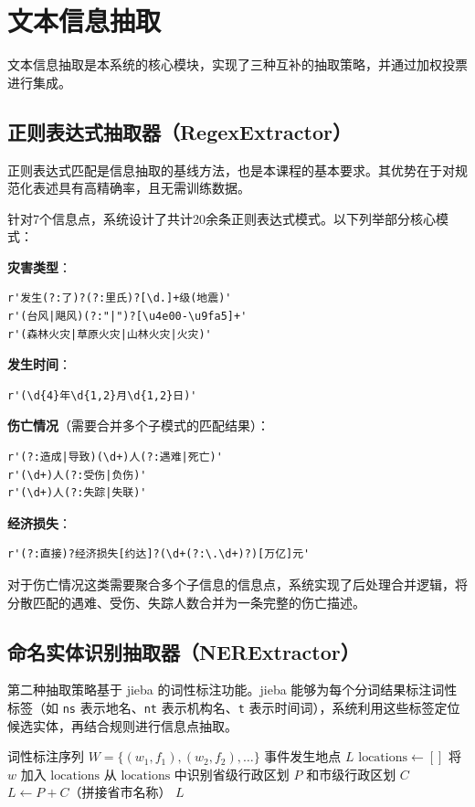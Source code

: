 \documentclass[12pt, a4paper]{ctexart}
\begin{document}
\section{文本信息抽取}

文本信息抽取是本系统的核心模块，实现了三种互补的抽取策略，并通过加权投票进行集成。

\subsection{正则表达式抽取器（RegexExtractor）}

正则表达式匹配是信息抽取的基线方法，也是本课程的基本要求。其优势在于对规范化表述具有高精确率，且无需训练数据。

针对7个信息点，系统设计了共计20余条正则表达式模式。以下列举部分核心模式：

\textbf{灾害类型}：
\begin{lstlisting}
r'发生(?:了)?(?:里氏)?[\d.]+级(地震)'
r'(台风|飓风)(?:"|")?[\u4e00-\u9fa5]+'
r'(森林火灾|草原火灾|山林火灾|火灾)'
\end{lstlisting}

\textbf{发生时间}：
\begin{lstlisting}
r'(\d{4}年\d{1,2}月\d{1,2}日)'
\end{lstlisting}

\textbf{伤亡情况}（需要合并多个子模式的匹配结果）：
\begin{lstlisting}
r'(?:造成|导致)(\d+)人(?:遇难|死亡)'
r'(\d+)人(?:受伤|负伤)'
r'(\d+)人(?:失踪|失联)'
\end{lstlisting}

\textbf{经济损失}：
\begin{lstlisting}
r'(?:直接)?经济损失[约达]?(\d+(?:\.\d+)?)[万亿]元'
\end{lstlisting}

对于伤亡情况这类需要聚合多个子信息的信息点，系统实现了后处理合并逻辑，将分散匹配的遇难、受伤、失踪人数合并为一条完整的伤亡描述。

\subsection{命名实体识别抽取器（NERExtractor）}

第二种抽取策略基于 jieba 的词性标注功能。jieba 能够为每个分词结果标注词性标签（如 \texttt{ns} 表示地名、\texttt{nt} 表示机构名、\texttt{t} 表示时间词），系统利用这些标签定位候选实体，再结合规则进行信息点抽取。

\begin{algorithm}[H]
\caption{基于NER的地点信息抽取}
\begin{algorithmic}[1]
\REQUIRE 词性标注序列 $W = \{(w_1, f_1), (w_2, f_2), \ldots\}$
\ENSURE 事件发生地点 $L$
\STATE $\text{locations} \leftarrow []$
        \STATE 将 $w$ 加入 $\text{locations}$
    \ENDIF
\ENDFOR
\STATE 从 $\text{locations}$ 中识别省级行政区划 $P$ 和市级行政区划 $C$
\STATE $L \leftarrow P + C$（拼接省市名称）
\RETURN $L$
\end{algorithmic}
\end{algorithm}
\end{document}
